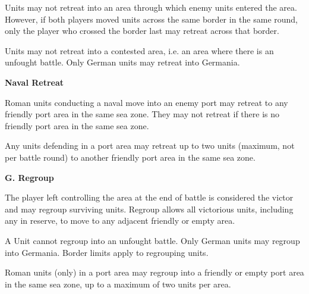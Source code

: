 Units may not retreat into an area through which enemy units entered the area. However, if both players moved units across the same border in the same round, only the player who crossed the border last may retreat across that border.

Units may not retreat into a contested area, i.e. an area where there is an unfought battle. Only German units may retreat into Germania.

\textbf{Naval Retreat}
\par
Roman units conducting a naval move into an enemy port may retreat to any friendly port area in the same sea zone. They may not retreat if there is no friendly port area in the same sea zone.

Any units defending in a port area may retreat up to two units (maximum, not per battle round) to another friendly port area in the same sea zone.

\textbf{G. Regroup}
\par
The player left controlling the area at the end of battle is considered the victor and may regroup surviving units. Regroup allows all victorious units, including any in reserve, to move to any adjacent friendly or empty area.

A Unit cannot regroup into an unfought battle. Only German units may regroup into Germania. Border limits apply to regrouping units.

Roman units (only) in a port area may regroup into a friendly or empty port area in the same sea zone, up to a maximum of two units per area.